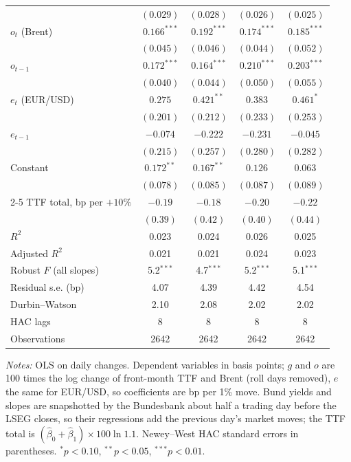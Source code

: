 \documentclass[11pt,a4paper]{article}
\begin{document}
\begin{table}[htbp]
\begin{tabular}{@{}l*{4}{c}@{}}
 & $(0.029)$ & $(0.028)$ & $(0.026)$ & $(0.025)$\\
$o_t$ (Brent) & $0.166^{***}$ & $0.192^{***}$ & $0.174^{***}$ & $0.185^{***}$\\
 & $(0.045)$ & $(0.046)$ & $(0.044)$ & $(0.052)$\\
$o_{t-1}$ & $0.172^{***}$ & $0.164^{***}$ & $0.210^{***}$ & $0.203^{***}$\\
 & $(0.040)$ & $(0.044)$ & $(0.050)$ & $(0.055)$\\
$e_t$ (EUR/USD) & $0.275$ & $0.421^{**}$ & $0.383$ & $0.461^{*}$\\
 & $(0.201)$ & $(0.212)$ & $(0.233)$ & $(0.253)$\\
$e_{t-1}$ & $-0.074$ & $-0.222$ & $-0.231$ & $-0.045$\\
 & $(0.215)$ & $(0.257)$ & $(0.280)$ & $(0.282)$\\
Constant & $0.172^{**}$ & $0.167^{**}$ & $0.126$ & $0.063$\\
 & $(0.078)$ & $(0.085)$ & $(0.087)$ & $(0.089)$\\
\cmidrule(l){2-5}
TTF total, bp per $+10\%$ & $-0.19$ & $-0.18$ & $-0.20$ & $-0.22$\\
 & $(0.39)$ & $(0.42)$ & $(0.40)$ & $(0.44)$\\
$R^2$ & 0.023 & 0.024 & 0.026 & 0.025\\
Adjusted $R^2$ & 0.021 & 0.021 & 0.024 & 0.023\\
Robust $F$ (all slopes) & 5.2$^{***}$ & 4.7$^{***}$ & 5.2$^{***}$ & 5.1$^{***}$\\
Residual s.e. (bp) & 4.07 & 4.39 & 4.42 & 4.54\\
Durbin--Watson & 2.10 & 2.08 & 2.02 & 2.02\\
HAC lags & 8 & 8 & 8 & 8\\
Observations & 2642 & 2642 & 2642 & 2642\\
\bottomrule
\end{tabular}
\par\vspace{4pt}\begin{minipage}{0.94\textwidth}\scriptsize\textit{Notes:} OLS on daily changes. Dependent variables in basis points; $g$ and $o$ are 100 times the log change of front-month TTF and Brent (roll days removed), $e$ the same for EUR/USD, so coefficients are bp per 1\% move. Bund yields and slopes are snapshotted by the Bundesbank about half a trading day before the LSEG closes, so their regressions add the previous day's market moves; the TTF total is $(\hat\beta_0+\hat\beta_1)\times 100\ln 1.1$. Newey--West HAC standard errors in parentheses. $^{*}p<0.10$, $^{**}p<0.05$, $^{***}p<0.01$.\end{minipage}
\end{table}
\end{document}
